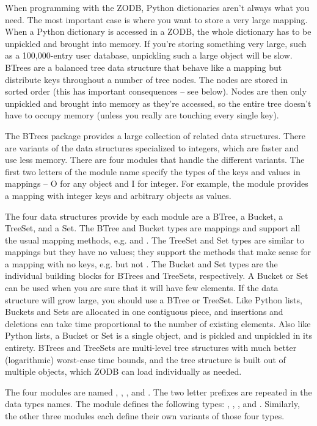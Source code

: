 When programming with the ZODB, Python dictionaries aren't always what
you need.  The most important case is where you want to store a very
large mapping.  When a Python dictionary is accessed in a ZODB, the
whole dictionary has to be unpickled and brought into memory.  If
you're storing something very large, such as a 100,000-entry user
database, unpickling such a large object will be slow.  BTrees are a
balanced tree data structure that behave like a mapping but distribute
keys throughout a number of tree nodes.  The nodes are stored in
sorted order (this has important consequences -- see below).  Nodes are
then only unpickled and brought into memory as they're accessed, so the
entire tree doesn't have to occupy memory (unless you really are
touching every single key).

The BTrees package provides a large collection of related data
structures.  There are variants of the data structures specialized to
integers, which are faster and use less memory.  There
are four modules that handle the different variants.  The first two
letters of the module name specify the types of the keys and values in
mappings -- O for any object and I for integer.  For example, the
 module provides a mapping with integer
keys and arbitrary objects as values.

The four data structures provide by each module are a BTree, a Bucket,
a TreeSet, and a Set.  The BTree and Bucket types are mappings and
support all the usual mapping methods, e.g.  and
.  The TreeSet and Set types are similar to mappings
but they have no values; they support the methods that make sense for
a mapping with no keys, e.g.  but not
.  The Bucket and Set types are the individual
building blocks for BTrees and TreeSets, respectively.  A Bucket or
Set can be used when you are sure that it will have few elements.  If
the data structure will grow large, you should use a BTree or TreeSet.
Like Python lists, Buckets and Sets are allocated in one
contiguous piece, and insertions and deletions can take time
proportional to the number of existing elements.  Also like Python lists,
a Bucket or Set is a single object, and is pickled and unpickled in its
entirety.  BTrees and TreeSets are multi-level tree structures with
much better (logarithmic) worst-case time bounds, and the tree structure
is built out of multiple objects, which ZODB can load individually
as needed.

The four modules are named , ,
, and .  The two letter prefixes are
repeated in the data types names.  The  module
defines the following types: , ,
, and .  Similarly, the other three modules
each define their own variants of those four types.

